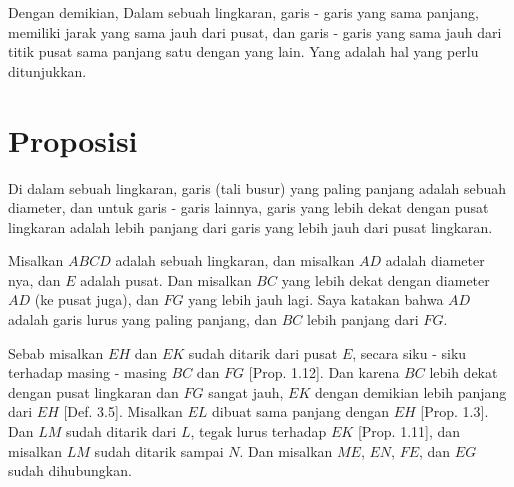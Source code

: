 \documentclass[a4paper]{book}
\begin{document}
Dengan demikian, Dalam sebuah lingkaran, garis - garis yang sama panjang, 
memiliki jarak yang sama jauh dari pusat, dan garis - garis yang sama jauh
 dari titik pusat sama panjang satu dengan yang lain. Yang adalah hal yang perlu
ditunjukkan.

\section*{\centering Proposisi \thesection}
Di dalam sebuah lingkaran, garis (tali busur) yang paling panjang adalah 
sebuah diameter, 
dan untuk garis - garis lainnya, garis yang lebih dekat dengan pusat lingkaran
adalah lebih panjang dari garis yang lebih jauh dari pusat lingkaran.
\begin{center}
\end{center}

Misalkan $ABCD$ adalah sebuah lingkaran, dan misalkan $AD$ adalah diameter nya,
dan $E$ adalah pusat. Dan misalkan $BC$ yang lebih dekat dengan diameter $AD$ 
(ke pusat juga), dan $FG$ yang lebih jauh lagi. Saya katakan bahwa $AD$ adalah 
garis lurus yang paling panjang, dan $BC$ lebih panjang dari $FG$.

Sebab misalkan $EH$ dan $EK$ sudah ditarik dari pusat $E$, secara siku - siku 
terhadap masing - masing $BC$ dan $FG$ [Prop. 1.12]. Dan karena $BC$ lebih 
dekat dengan pusat lingkaran dan $FG$ sangat jauh, $EK$ dengan demikian 
lebih panjang dari $EH$ [Def. 3.5]. Misalkan $EL$ dibuat sama panjang dengan 
$EH$ [Prop. 1.3].  Dan $LM$ sudah ditarik dari $L$, tegak lurus terhadap 
$EK$ [Prop. 1.11], dan misalkan $LM$ sudah ditarik sampai $N$. Dan misalkan 
$ME$, $EN$, $FE$, dan $EG$ sudah dihubungkan.
\end{document}
